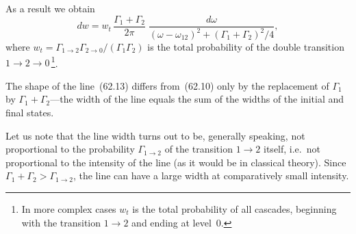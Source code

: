 As a result we obtain
\begin{equation}
dw = w_t\,\frac{\Gamma_1 + \Gamma_2}{2\pi}\;\frac{d\omega}{(\omega - \omega_{12})^2 + (\Gamma_1 + \Gamma_2)^2/4},
\tag{62.13}
\end{equation}
where $w_t = \Gamma_{1\to 2}\Gamma_{2\to 0}/(\Gamma_1\Gamma_2)$ is the total probability of the double transition $1 \to 2 \to 0$\,\footnote{In more complex cases $w_t$ is the total probability of all cascades, beginning with the transition $1 \to 2$ and ending at level~0.}.

The shape of the line~(62.13) differs from~(62.10) only by the replacement of $\Gamma_1$ by $\Gamma_1 + \Gamma_2$---the width of the line equals the sum of the widths of the initial and final states.

Let us note that the line width turns out to be, generally speaking, not proportional to the probability $\Gamma_{1\to 2}$ of the transition $1 \to 2$ itself, i.e.\ not proportional to the intensity of the line (as it would be in classical theory). Since $\Gamma_1 + \Gamma_2 > \Gamma_{1\to 2}$, the line can have a large width at comparatively small intensity.
